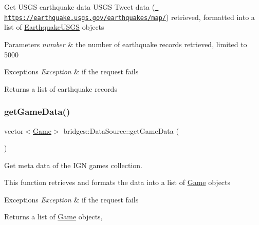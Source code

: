 Get U\+S\+GS earthquake data U\+S\+GS Tweet data (\href{https://earthquake.usgs.gov/earthquakes/map/}{\texttt{ https\+://earthquake.\+usgs.\+gov/earthquakes/map/}}) retrieved, formatted into a list of \mbox{\hyperlink{classbridges_1_1_earthquake_u_s_g_s}{Earthquake\+U\+S\+GS}} objects


\begin{DoxyParams}{Parameters}
{\em number} & the number of earthquake records retrieved, limited to 5000 \\
\hline
\end{DoxyParams}

\begin{DoxyExceptions}{Exceptions}
{\em Exception} & if the request fails\\
\hline
\end{DoxyExceptions}
\begin{DoxyReturn}{Returns}
a list of earthquake records 
\end{DoxyReturn}
\mbox{\label{classbridges_1_1_data_source_aa902e1dffd4169e2f6e6820299b8cde1}} 
\subsubsection{\texorpdfstring{getGameData()}{getGameData()}}
{\footnotesize\ttfamily vector$<$\mbox{\hyperlink{classbridges_1_1_game}{Game}}$>$ bridges\+::\+Data\+Source\+::get\+Game\+Data (\begin{DoxyParamCaption}{ }\end{DoxyParamCaption})\hspace{0.3cm}{\ttfamily [inline]}}

Get meta data of the I\+GN games collection.

This function retrieves and formats the data into a list of \mbox{\hyperlink{classbridges_1_1_game}{Game}} objects


\begin{DoxyExceptions}{Exceptions}
{\em Exception} & if the request fails\\
\hline
\end{DoxyExceptions}
\begin{DoxyReturn}{Returns}
a list of \mbox{\hyperlink{classbridges_1_1_game}{Game}} objects, 
\end{DoxyReturn}
\mbox{\label{classbridges_1_1_data_source_ac4edf55c163c60f17b13f5499e5d2e65}} 
